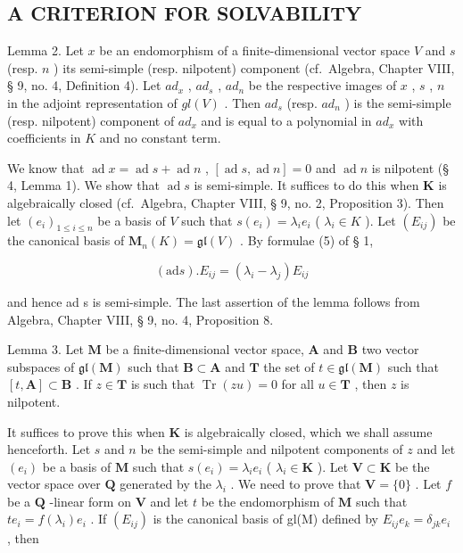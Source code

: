 \subsection{A CRITERION FOR SOLVABILITY}

Lemma 2. Let \(x\) be an endomorphism of a finite-dimensional vector space \(V\) and \(s\) (resp. \(n\) ) its semi-simple (resp. nilpotent) component (cf.~Algebra, Chapter VIII, § 9, no. 4, Definition 4). Let \(ad_x\) , \(ad_s\) , \(ad_n\) be the respective images of \(x\) , \(s\) , \(n\) in the adjoint representation of \(gl(V)\) . Then \(ad_s\) (resp. \(ad_n\) ) is the semi-simple (resp. nilpotent) component of \(ad_x\) and is equal to a polynomial in \(ad_x\) with coefficients in \(K\) and no constant term.

We know that \(\operatorname{ad} x = \operatorname{ad} s + \operatorname{ad} n\) , \([\operatorname{ad} s, \operatorname{ad} n] = 0\) and \(\operatorname{ad} n\) is nilpotent (§ 4, Lemma 1). We show that \(\operatorname{ad} s\) is semi-simple. It suffices to do this when \(\mathbf{K}\) is algebraically closed (cf.~Algebra, Chapter VIII, § 9, no. 2, Proposition 3). Then let \((e_i)_{1 \leq i \leq n}\) be a basis of \(V\) such that \(s(e_i) = \lambda_i e_i\) ( \(\lambda_i \in K\) ). Let \((E_{ij})\) be the canonical basis of \(\mathbf{M}_n(K) = \mathfrak{gl}(V)\) . By formulae (5) of § 1,

\[
(\mathrm{ad} s). E _ {i j} = (\lambda_ {i} - \lambda_ {j}) E _ {i j}
\]

and hence ad s is semi-simple. The last assertion of the lemma follows from Algebra, Chapter VIII, § 9, no. 4, Proposition 8.

Lemma 3. Let \(\mathbf{M}\) be a finite-dimensional vector space, \(\mathbf{A}\) and \(\mathbf{B}\) two vector subspaces of \(\mathfrak{gl}(\mathbf{M})\) such that \(\mathbf{B} \subset \mathbf{A}\) and \(\mathbf{T}\) the set of \(t \in \mathfrak{gl}(\mathbf{M})\) such that \([t, \mathbf{A}] \subset \mathbf{B}\) . If \(z \in \mathbf{T}\) is such that \(\operatorname{Tr}(zu) = 0\) for all \(u \in \mathbf{T}\) , then \(z\) is nilpotent.

It suffices to prove this when \(\mathbf{K}\) is algebraically closed, which we shall assume henceforth. Let \(s\) and \(n\) be the semi-simple and nilpotent components of \(z\) and let \((e_i)\) be a basis of \(\mathbf{M}\) such that \(s(e_i) = \lambda_i e_i\) ( \(\lambda_i \in \mathbf{K}\) ). Let \(\mathbf{V} \subset \mathbf{K}\) be the vector space over \(\mathbf{Q}\) generated by the \(\lambda_i\) . We need to prove that \(\mathbf{V} = \{0\}\) . Let \(f\) be a \(\mathbf{Q}\) -linear form on \(\mathbf{V}\) and let \(t\) be the endomorphism of \(\mathbf{M}\) such that \(te_{i}=f(\lambda_{i})e_{i}\) . If \((E_{ij})\) is the canonical basis of gl(M) defined by \(E_{ij}e_{k}=\delta_{jk}e_{i}\) , then

